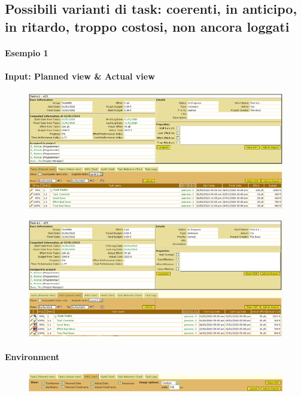 \subsection{Possibili varianti di task: coerenti, in anticipo, in ritardo, troppo costosi, non ancora loggati}

\paragraph{Esempio 1}
\paragraph{Input: Planned view & Actual view}
\begin{figure}
\centering
\includegraphics[width=\textwidth]{tests/TEST_WBS/4.1/4.1_4_5/Esempio_1/input.png}
\end{figure}
\begin{figure}
\centering
\includegraphics[width=\textwidth]{tests/TEST_WBS/4.1/4.1_4_5/Esempio_1/input_actual.png}
\end{figure}
\newpage

\paragraph{Environment}
\begin{figure}
\centering
\includegraphics[width=\textwidth]{tests/TEST_WBS/4.1/4.1_4_5/Esempio_1/environment.png}
\end{figure}

